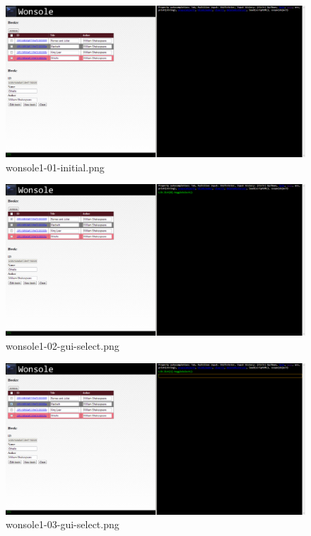 \centering
\begin{figure}
\includegraphics[width=\textwidth]{screenshot/wonsole1-01-initial.png}
\caption{wonsole1-01-initial.png}
\label{wonsole1-01-initial.png}
\end{figure}


\begin{figure}
\includegraphics[width=\textwidth]{screenshot/wonsole1-02-gui-select.png}
\caption{wonsole1-02-gui-select.png}
\label{wonsole1-02-gui-select.png}
\end{figure}


\clearpage
\begin{figure}
\includegraphics[width=\textwidth]{screenshot/wonsole1-03-gui-select.png}
\caption{wonsole1-03-gui-select.png}
\label{wonsole1-03-gui-select.png}
\end{figure}


